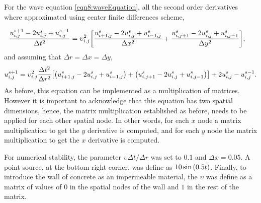 \documentclass[main.tex]{subfiles}
\begin{document}
For the wave equation \eqref{eqn8:waveEquation}, all the second order derivatives where approximated using center finite differences scheme,

\begin{align*}
    \frac{u_{i,j}^{s+1} - 2u_{i,j}^s + u_{i,j}^{s-1}}{\Delta t ^2} &= \upsilon_{i,j}^2\qty[\frac{u_{i+1,j}^s - 2u_{i,j}^s + u_{i-1,j}^s}{\Delta x ^2} + \frac{u_{i,j+1}^s - 2u_{i,j}^s + u_{i,j-1}^s}{\Delta y ^2}],
\end{align*}
and assuming that $\Delta r = \Delta x = \Delta y$,
\begin{gather*}
    u_{i,j}^{s+1} = \upsilon_{i,j}^2\frac{\Delta t^2}{\Delta r^2}\qty[\qty(u_{i+1,j}^s - 2u_{i,j}^s + u_{i-1,j}^s) + \qty(u_{i,j+1}^s - 2u_{i,j}^s + u_{i,j-1}^s)] + 2u_{i,j}^s - u_{i,j}^{s-1}.
\end{gather*}
As before, this equation can be implemented as a multiplication of matrices.
However it is important to acknowledge that this equation has two spatial dimensions, hence, the matrix multiplication established as before, needs to be applied for each other spatial node.
In other words, for each $x$ node a matrix multiplication to get the $y$ derivative is computed, and for each $y$ node the matrix multiplication to get the $x$ derivative is computed.

For numerical stability, the parameter $\upsilon\Delta t/\Delta r$ was set to $0.1$ and $\Delta x = 0.05$.
A point source, at the bottom right corner, was define as $10\sin\qty(0.5 t)$.
Finally, to introduce the wall of concrete as an impermeable material, the $\upsilon$ was define as a matrix of values of $0$ in the spatial nodes of the wall and $1$ in the rest of the matrix.
\end{document}
